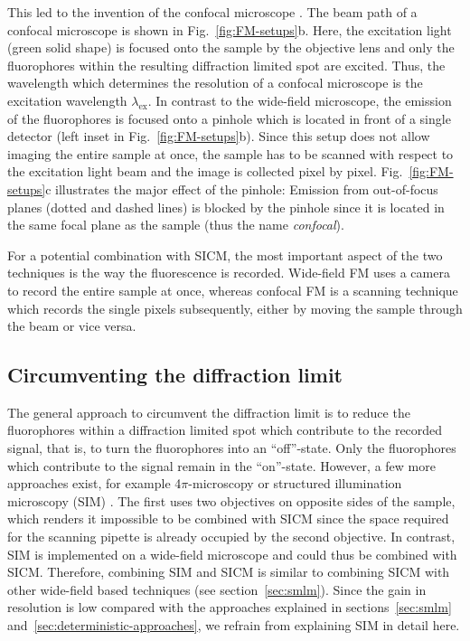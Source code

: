 This led to the invention of the confocal microscope
\cite{Heimstaedt1911,Minsky1988}. The beam path of a confocal microscope is
shown in Fig.~\ref{fig:FM-setups}b. Here, the excitation light (green solid
shape) is focused onto the sample by the objective lens and only the
fluorophores within the resulting diffraction limited spot are excited. Thus, the
wavelength which determines the resolution of a confocal microscope is the
excitation wavelength $\lambda_\text{ex}$.  In contrast to the wide-field
microscope, the emission of the fluorophores is focused onto a pinhole which
is located in front of a single detector (left inset in
Fig.~\ref{fig:FM-setups}b). Since this setup does not allow imaging the entire
sample at once, the sample has to be scanned with respect to the excitation
light beam and the image is collected pixel by
pixel. Fig.~\ref{fig:FM-setups}c illustrates the major effect of the pinhole:
Emission from out-of-focus planes (dotted and dashed lines) is blocked by the
pinhole since it is located in the same focal plane as the sample (thus the
name \emph{confocal}). 

For a potential combination with SICM, the most important aspect of the two
techniques is the way the fluorescence is recorded. Wide-field FM uses a 
camera to record the entire sample at once, whereas confocal FM is a scanning
technique which records the single pixels subsequently, either by moving the
sample through the beam or vice versa.

\subsection{Circumventing the diffraction limit}
\label{sec:circumvent-diffraction-limit}
The general approach to circumvent the diffraction limit is to reduce the
fluorophores within a diffraction limited spot which contribute to the
recorded signal, that is, to turn the fluorophores into an ``off''-state. Only
the fluorophores which contribute to the signal remain in the ``on''-state.
However, a few more approaches exist, for example 4$\pi$-microscopy
\cite{Hell1994} or structured illumination microscopy (SIM)
\cite{Guerra1995}. The first uses two objectives on opposite sides of the
sample, which renders it impossible to be combined with SICM since the space
required for the scanning pipette is already occupied by the second
objective. In contrast, SIM is implemented on a wide-field microscope and
could thus be combined with SICM. Therefore, combining SIM and SICM is similar
to combining SICM with other wide-field based techniques (see
section~\ref{sec:smlm}). Since the gain in resolution is low compared with the
approaches explained in sections~\ref{sec:smlm}
and~\ref{sec:deterministic-approaches}, we refrain from explaining SIM in
detail here.


